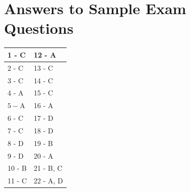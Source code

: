 \documentclass[10pt]{article}
\begin{document}
\section*{Answers to Sample Exam Questions}
\begin{center}
\begin{tabular}{|l|l|}
\hline
1 - C & 12 - A \\
\hline
2 - C & 13 - C \\
\hline
3 - C & 14 - C \\
\hline
4 - A & 15 - C \\
\hline
$5-\mathrm{A}$ & 16 - A \\
\hline
6 - C & 17 - D \\
\hline
7 - C & 18 - D \\
\hline
8 - D & 19 - B \\
\hline
9 - D & 20 - A \\
\hline
10 - B & 21 - B, C \\
\hline
11 - C & 22 - A, D \\
\hline
\end{tabular}
\end{center}
\end{document}
